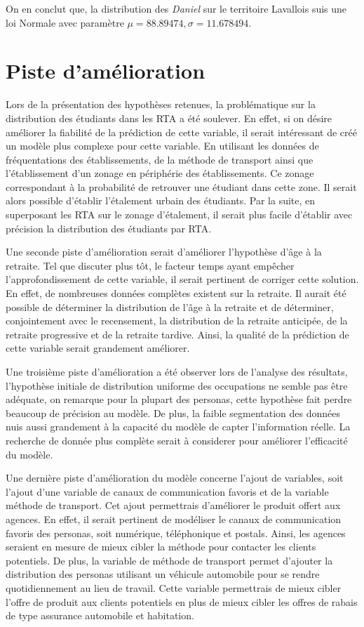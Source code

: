 \documentclass[11pt,french]{report}\usepackage[]{graphicx}\usepackage[]{color}
\begin{document}
On en conclut que, la distribution des \emph{Daniel} sur le territoire Lavallois suis une loi Normale avec paramètre $\mu = 88.89474, \sigma = 11.678494$.

\section*{Piste d'amélioration}
Lors de la présentation des hypothèses retenues, la problématique sur la distribution des étudiants dans les RTA a été soulever. En effet, si on désire améliorer la fiabilité de la prédiction de cette variable, il serait intéressant de créé un modèle plus complexe pour cette variable. En utilisant les données de fréquentations des établissements, de la méthode de transport ainsi que l'établissement d'un zonage en périphérie des établissements. Ce zonage correspondant à la probabilité de retrouver une étudiant dans cette zone. Il serait alors possible d'établir l'étalement urbain des étudiants. Par la suite, en superposant les RTA sur le zonage d'étalement, il serait plus facile d'établir avec précision la distribution des étudiants par RTA. 
\newline

Une seconde piste d'amélioration serait d'améliorer l'hypothèse d'âge à la retraite. Tel que discuter plus tôt, le facteur temps ayant empêcher l'approfondissement de cette variable, il serait pertinent de corriger cette solution. En effet, de nombreuses données complètes existent sur la retraite. Il aurait été possible de déterminer la distribution de l'âge à la retraite et de déterminer, conjointement avec le recensement, la distribution de la retraite anticipée, de la retraite progressive et de la retraite tardive. Ainsi, la qualité de la prédiction de cette variable serait grandement améliorer.

Une troisième piste d'amélioration a été observer lors de l'analyse des résultats, l'hypothèse initiale de distribution uniforme des occupations ne semble pas être adéquate, on remarque pour la plupart des personas, cette hypothèse fait perdre beaucoup de précision au modèle. De plus, la faible segmentation des données nuis aussi grandement à la capacité du modèle de capter l'information réelle. La recherche de donnée plus complète serait à considerer pour améliorer l'efficacité du modèle.

Une dernière piste d'amélioration du modèle concerne l'ajout de variables, soit l'ajout d'une variable de canaux de communication favoris et de la variable méthode de transport. Cet ajout permettrais d'améliorer le produit offert aux agences. En effet, il serait pertinent de modéliser le canaux de communication favoris des personas, soit numérique, téléphonique et postals. Ainsi, les agences seraient en mesure de mieux cibler la méthode pour contacter les clients potentiels. De plus, la variable de méthode de transport permet d'ajouter la distribution des personas utilisant un véhicule automobile pour se rendre quotidiennement au lieu de travail. Cette variable permettrais de mieux cibler l'offre de produit aux clients potentiels en plus de mieux cibler les offres de rabais de type assurance automobile et habitation.
\end{document}
